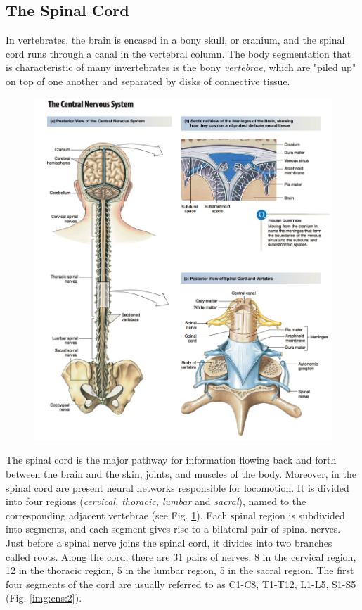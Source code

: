 \documentclass[a4paper,11pt,openright,twoside]{book}
\begin{document}
\subsection{The Spinal Cord}
In vertebrates, the brain is encased in a bony skull, or cranium, and the spinal cord runs through a canal in the vertebral column. The body segmentation that is characteristic of many invertebrates is the bony \emph{vertebrae}, which are "piled up" on top of one another and separated by disks of connective tissue. 

\newpage

\begin{figure}[h!]
\centering
\includegraphics[width=\textwidth]{images/spinal_cord}
\label{img:cns:1}
\end{figure}

\newpage

The spinal cord is the major pathway for information flowing back and forth between the brain and the skin, joints, and muscles of the body. Moreover, in the spinal cord are present neural networks responsible for locomotion. It is divided into four regions (\emph{cervical, thoracic, lumbar} and \emph{sacral}), named to the corresponding adjacent vertebrae (see Fig. \ref{img:cns:1}). Each spinal region is subdivided into segments, and each segment gives rise to a bilateral pair of spinal nerves. Just before a spinal nerve joins the spinal cord, it divides into two branches called roots. Along the cord, there are 31 pairs of nerves: 8 in the cervical region, 12 in the thoracic region, 5 in the lumbar region, 5 in the sacral region. The first four segments of the cord are usually referred to as C1-C8, T1-T12, L1-L5, S1-S5 (Fig. \ref{img:cns:2}).
\end{document}
